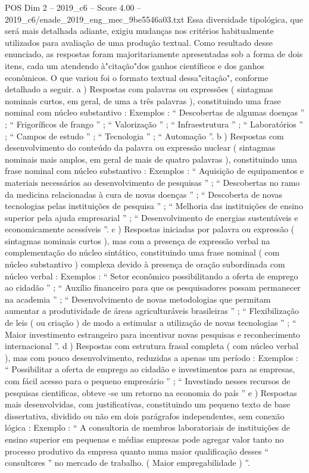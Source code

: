 \begin{textsample}{POS Dim 2 – 2019\_c6 – Score 4.00 – 2019\_c6/enade\_2019\_eng\_mec\_9be5546a03.txt}
Essa diversidade tipológica, que será mais detalhada adiante, exigiu mudanças nos critérios habitualmente utilizados para avaliação de uma produção textual.
Como resultado desse enunciado, as respostas foram majoritariamente apresentadas sob a forma de dois itens, cada um atendendo à"citação"dos ganhos científicos e dos ganhos econômicos.
O que variou foi o formato textual dessa"citação", conforme detalhado a seguir. a ) Respostas com palavras ou expressões ( sintagmas nominais curtos, em geral, de uma a três palavras ), constituindo uma frase nominal com núcleo substantivo : Exemplos : “ Descobertas de algumas doenças ” ; “ Frigoríficos de frango ” ; “ Valorização ” ; “ Infraestrutura ” ; “ Laboratórios ” ; “ Campos de estudo ” ; “ Tecnologia ” ; “ Automação ”. b ) Respostas com desenvolvimento do conteúdo da palavra ou expressão nuclear ( sintagmas nominais mais amplos, em geral de mais de quatro palavras ), constituindo uma frase nominal com núcleo substantivo : Exemplos : “ Aquisição de equipamentos e materiais necessários ao desenvolvimento de pesquisas ” ; “ Descobertas no ramo da medicina relacionadas à cura de novas doenças ” ; “ Descoberta de novas tecnologias pelas instituições de pesquisa ” ; “ Melhoria das instituições de ensino superior pela ajuda empresarial ” ; “ Desenvolvimento de energias sustentáveis e economicamente acessíveis ”. c ) Respostas iniciadas por palavra ou expressão ( sintagmas nominais curtos ), mas com a presença de expressão verbal na complementação do núcleo sintático, constituindo uma frase nominal ( com núcleo substantivo ) complexa devido à presença de oração subordinada com núcleo verbal : Exemplos : “ Setor econômico possibilitando a oferta de emprego ao cidadão ” ; “ Auxílio financeiro para que os pesquisadores possam permanecer na academia ” ; “ Desenvolvimento de novas metodologias que permitam aumentar a produtividade de áreas agriculturáveis brasileiras ” ; “ Flexibilização de leis ( ou criação ) de modo a estimular a utilização de novas tecnologias ” ; “ Maior investimento estrangeiro para incentivar novas pesquisas e reconhecimento internacional ”. d ) Respostas com estrutura frasal completa ( com núcleo verbal ), mas com pouco desenvolvimento, reduzidas a apenas um período : Exemplos : “ Possibilitar a oferta de emprego ao cidadão e investimentos para as empresas, com fácil acesso para o pequeno empresário ” ; “ Investindo nesses recursos de pesquisas cientificas, obteve -se um retorno na economia do país ” e ) Respostas mais desenvolvidas, com justificativas, constituindo um pequeno texto de base dissertativa, dividido ou não em dois parágrafos independentes, sem conexão lógica : Exemplo : “ A consultoria de membros laboratoriais de instituições de ensino superior em pequenas e médias empresas pode agregar valor tanto no processo produtivo da empresa quanto numa maior qualificação desses “ consultores ” no mercado de trabalho. ( Maior empregabilidade ) ”.

\end{textsample}
